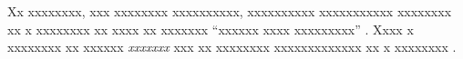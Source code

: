 Xx xxxxxxxx, xxx xxxxxxxx xxxxxxxxxx, xxxxxxxxxx xxxxxxxxxxx xxxxxxxx xx x
  xxxxxxxx xx xxxx xx xxxxxxx \enquote{xxxxxx xxxx xxxxxxxxx}%
  \cite{XxxxxXxXx:xxxx}.
  Xxxx x xxxxxxxx xx xxxxxx \emph{xxxxxxx} \cite{XxxxxXxXx:xxxx} xxx xx
    xxxxxxxx xxxxxxxxxxxxx xx x xxxxxxxx .
